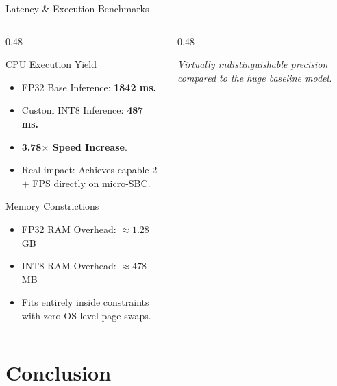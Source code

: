 \documentclass[aspectratio=169,11pt]{beamer}
\begin{document}
\begin{frame}{Latency \& Execution Benchmarks}
\begin{columns}
\begin{column}{0.48\textwidth}
\begin{block}{CPU Execution Yield}
\begin{itemize}
    \item FP32 Base Inference: \textbf{1842 ms.}
    \item Custom INT8 Inference: \textbf{487 ms.}
    \item \textbf{3.78$\times$ Speed Increase}.
    \item Real impact: Achieves capable 2$+$ FPS directly on micro-SBC.
\end{itemize}
\end{block}
\begin{block}{Memory Constrictions}
\begin{itemize}
    \item FP32 RAM Overhead: $\approx 1.28$ GB
    \item INT8 RAM Overhead: $\approx 478$ MB
    \item Fits entirely inside constraints with zero OS-level page swaps.
\end{itemize}
\end{block}
\end{column}
\begin{column}{0.48\textwidth}
\centering
{}

\textit{Virtually indistinguishable precision compared to the huge baseline model.}
\end{column}
\end{columns}
\end{frame}

\section{Conclusion}
\end{document}
